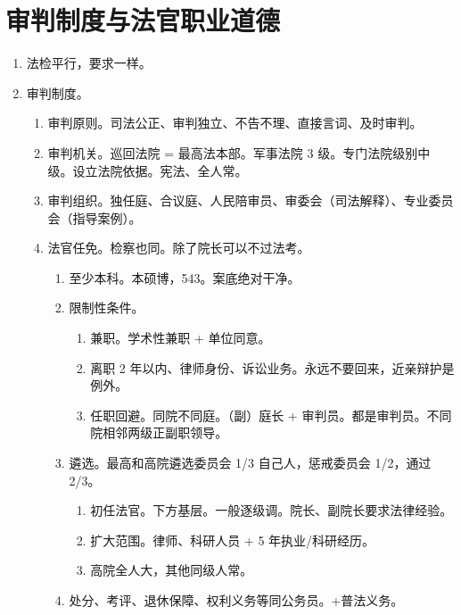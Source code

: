 \section{审判制度与法官职业道德}
\begin{enumerate}
  \item 法检平行，要求一样。
  \item 审判制度。
        \begin{enumerate}
          \item 审判原则。司法公正、审判独立、不告不理、直接言词、及时审判。
          \item 审判机关。巡回法院 = 最高法本部。军事法院 3 级。专门法院级别中级。设立法院依据。宪法、全人常。
          \item 审判组织。独任庭、合议庭、人民陪审员、审委会（司法解释）、专业委员会（指导案例）。
          \item 法官任免。检察也同。除了院长可以不过法考。
                \begin{enumerate}
                  \item 至少本科。本硕博，543。案底绝对干净。
                  \item 限制性条件。
                        \begin{enumerate}
                          \item 兼职。学术性兼职 + 单位同意。
                          \item 离职 2 年以内、律师身份、诉讼业务。永远不要回来，近亲辩护是例外。
                          \item 任职回避。同院不同庭。\yi（副）庭长 + 审判员。\er 都是审判员。不同院相邻两级正副职领导。
                        \end{enumerate}
                  \item 遴选。最高和高院遴选委员会 1/3 自己人，惩戒委员会 1/2，通过 2/3。
                        \begin{enumerate}
                          \item 初任法官。下方基层。一般逐级调。院长、副院长要求法律经验。
                          \item 扩大范围。律师、科研人员 + 5 年执业/科研经历。
                          \item 高院全人大，其他同级人常。
                        \end{enumerate}
                  \item 处分、考评、退休保障、权利义务等同公务员。+普法义务。
                \end{enumerate}
        \end{enumerate}

\end{enumerate}
